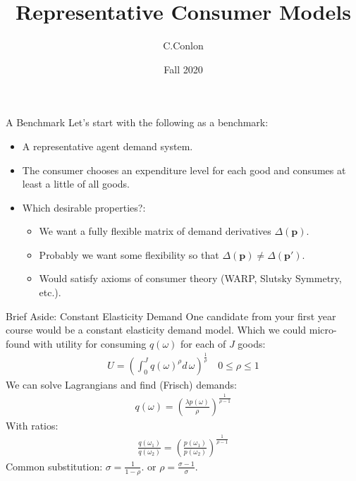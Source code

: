 \documentclass[xcolor=pdftex,dvipsnames,table,mathserif,aspectratio=169]{beamer}
\title{Representative Consumer Models}
\author{C.Conlon}
\institute{Grad IO }
\date{Fall 2020}
\begin{document}
\frame{\titlepage}

\begin{frame}{A Benchmark}
Let's start with the following as a benchmark:
\begin{itemize}
\item A \alert{representative agent} demand system.
\item The consumer chooses an \alert{expenditure} level for each good and consumes at least a little of all goods.
\item Which desirable properties?:
\begin{itemize}
\item We want a fully flexible matrix of demand derivatives $\Delta(\mathbf{p})$.
\item Probably we want some flexibility so that $\Delta(\mathbf{p}) \neq \Delta(\mathbf{p'})$.
\item Would satisfy axioms of consumer theory (WARP, Slutsky Symmetry, etc.).
\end{itemize}
\end{itemize}
\end{frame}



\begin{frame}{Brief Aside: Constant Elasticity Demand}
One candidate from your first year course would be a \alert{constant elasticity demand model}. Which we could micro-found with utility for consuming $q(\omega)$ for each of $J$ goods:
\begin{eqnarray*}
U  = \left( \int_{0}^{J} q(\omega)^{\rho} d\, \omega \right)^{\frac{1}{\rho}} \quad 0 \leq \rho \leq 1
\end{eqnarray*}
We can solve Lagrangians and find (Frisch) demands:
\begin{eqnarray*}
q(\omega) = \left( \frac{\lambda p(\omega)}{\rho} \right)^{\frac{1}{\rho-1}}
\end{eqnarray*}
With ratios:
\begin{eqnarray*}
\frac{q(\omega_1)}{q(\omega_2)} = \left( \frac{p(\omega_1)}{p(\omega_2)} \right)^{\frac{1}{\rho-1}}
\end{eqnarray*}
Common substitution: $\sigma = \frac{1}{1-\rho}$. or $\rho = \frac{\sigma-1}{\sigma}$.
\end{frame}
\end{document}
